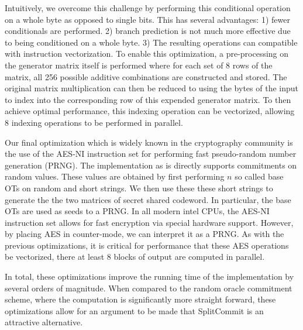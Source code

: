 Intuitively, we overcome this challenge by performing this conditional operation on a whole byte as opposed to single bits. This has several advantages: 1) fewer conditionals are performed. 2) branch prediction is not much more effective due to being conditioned on a whole byte.  3) The resulting operations can compatible with instruction vectorization. To enable this optimization, a pre-processing on the generator matrix itself is performed where for each set of 8 rows of the matrix, all 256 possible additive combinations are constructed and stored. The original matrix multiplication can then be reduced to using the bytes of the input to index into the corresponding row of this expended generator matrix. To then achieve optimal performance, this indexing operation can be vectorized, allowing 8 indexing operations to be performed in parallel. 

Our final optimization which is widely known in the cryptography community is the use of the AES-NI instruction set for performing fast pseudo-random number generation (PRNG). The implementation as is directly supports commitments on random values. These values are obtained by first performing $n$ so called base OTs on random and short strings. We then use these these short strings to generate the the two matrices of secret shared codeword. In particular, the base OTs are used as seeds to a PRNG. In all modern intel CPUs, the AES-NI instruction set allows for fast encryption via special hardware support. However, by placing AES in counter-mode, we can interpret it as a PRNG. As with the previous optimizations, it is critical for performance that these AES operations be vectorized, there at least 8 blocks of output are computed in parallel.

In total, these optimizations improve the running time of the implementation by several orders of magnitude. When compared to the random oracle commitment scheme, where the computation is significantly more straight forward, these optimizations allow for an argument to be made that SplitCommit is an attractive alternative.